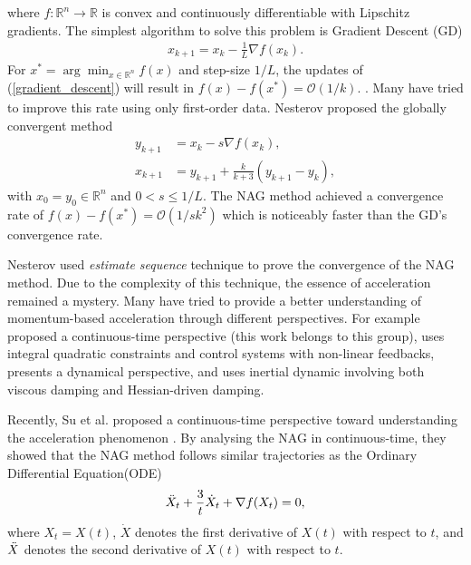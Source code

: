 \documentclass{article}
\theoremstyle{plain}
\theoremstyle{definition}
\theoremstyle{remark}
\begin{document}
where $f:\mathbb{R}^n\rightarrow \mathbb{R}$ is convex and continuously differentiable with Lipschitz gradients.
The simplest algorithm to solve this problem is Gradient Descent (GD)
\begin{align}\label{gradient_descent}
    x_{k+1}=x_k - \frac{1}{L} \nabla f(x_k).\tag{GD}
\end{align}
For $x^*=\arg \min_{x\in \mathbb{R}^n}f(x)$ and step-size $1/L$, the updates of (\ref{gradient_descent}) will result in $f(x)-f(x^*)=\mathcal{O}(1/k)$.
\cite{nesterov2003introductory}. Many have tried to improve this rate using only first-order data. Nesterov proposed the globally convergent method \cite{Nesterov1983AMF}
\begin{align}\label{eqn_Nest_alg}
    y_{k+1}&=x_k -s\nabla f(x_k),\nonumber\\
    x_{k+1}&= y_{k+1}+\frac{k}{k+3} (y_{k+1}-y_{k}), \tag{NAG}
\end{align}
with $x_0=y_0\in \mathbb{R}^n$ and $0<s\leq 1/L$. The NAG method achieved a convergence rate of $f(x)-f(x^*)=\mathcal{O}(1/sk^2)$ which is noticeably faster than the GD's convergence rate. \par
Nesterov used \textit{estimate sequence} technique to prove the convergence of the NAG method. Due to the complexity of this technique, the essence of acceleration remained a mystery. Many have tried to provide a better understanding of momentum-based acceleration through different perspectives. For example \cite{JMLR:v17:15-084} proposed a continuous-time perspective (this work belongs to this group), \cite{doi:10.1137/17M1136845} uses integral quadratic constraints and control systems with non-linear feedbacks, \cite{muehlebach2019dynamical} presents a dynamical perspective, and \cite{doi:10.1080/02331934.2021.2009828} uses inertial dynamic involving both viscous damping and Hessian-driven damping. \par
Recently, Su et al. proposed a continuous-time perspective toward understanding the acceleration phenomenon \cite{JMLR:v17:15-084}. By analysing the NAG in continuous-time, they showed that the NAG method follows similar trajectories as the Ordinary Differential Equation(ODE) 
\begin{align}\label{low-res-ode}
    \Ddot{X}_t+\frac{3}{t}\dot X_t+\nabla f(X_t)=0,
\end{align}
where $X_t=X(t)$, $\dot X$ denotes the first derivative of $X(t)$ with respect to $t$, and  $\Ddot X$ denotes the second derivative of $X(t)$ with respect to $t$.\par
\end{document}

